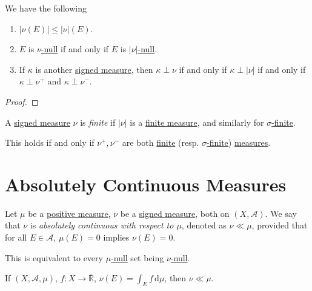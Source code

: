 \begin{lemma}
	We have the following
	\begin{enumerate}
		\item \(\left\vert \nu(E) \right\vert \leq \left\vert \nu \right\vert(E)\).
		\item \(E\) is \hyperref[def:null-set-for-a-signed-measure]{\(\nu\)-null} if and only if \(E\) is \hyperref[def:null-set-for-a-signed-measure]{\(\left\vert \nu \right\vert\)-null}.
		\item If \(\kappa\) is another \hyperref[def:signed-measure]{signed measure}, then \(\kappa \perp \nu\)
		      if and only if \(\kappa \perp \left\vert \nu \right\vert\) if and only if \(\kappa \perp \nu^+\) and \(\kappa \perp \nu^-\).
	\end{enumerate}
\end{lemma}
\begin{proof}
\end{proof}

\begin{definition}\label{def:finite-signed-measure}
	A \hyperref[def:signed-measure]{signed measure} \(\nu\) is \emph{finite} if \(\left\vert \nu \right\vert\) is a \hyperref[def:finite-measure]{finite measure},
	and similarly for \hyperref[def:sigma-finite-measure]{\(\sigma\)-finite}.
\end{definition}
\begin{remark}
	This holds if and only if \(\nu^+,\nu^-\) are both \hyperref[def:finite-measure]{finite} (resp. \hyperref[def:sigma-finite-measure]{\(\sigma\)-finite})
	\hyperref[def:measure]{measures}.
\end{remark}

\section{Absolutely Continuous Measures}
\begin{definition}\label{def:absolutely-continuous}
	Let \(\mu\) be a \hyperref[def:signed-measure]{positive measure}, \(\nu\) be a \hyperref[def:signed-measure]{signed measure}, both on \((X, \mathcal{A})\). We say that \(\nu\) is
	\emph{absolutely continuous with respect to \(\mu\)}, denoted as \(\nu \ll \mu\), provided that for all \(E \in \mathcal{A}\), \(\mu(E) = 0\) implies \(\nu(E) = 0\).
\end{definition}
\begin{remark}
	This is equivalent to every \hyperref[def:null-set-for-a-signed-measure]{\(\mu\)-null} set being \hyperref[def:null-set-for-a-signed-measure]{\(\nu\)-null}.
\end{remark}
\begin{eg}
	If \((X ,\mathcal{A}, \mu)\), \(f \colon X \to \overline{\mathbb{R}}\), \(\nu(E) = \int_E f \,\mathrm{d} \mu\), then \(\nu \ll \mu\).
\end{eg}

